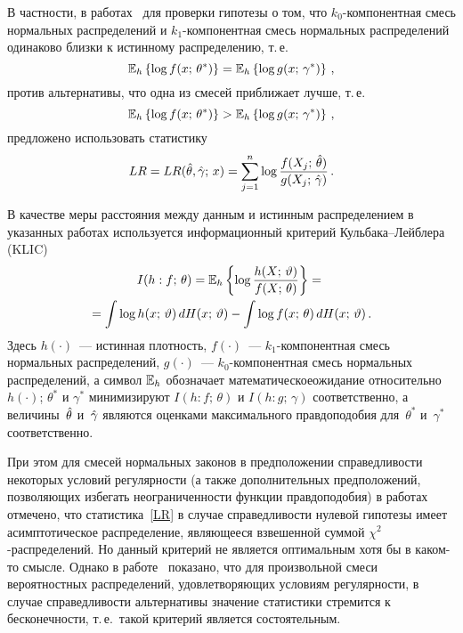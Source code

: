\begin{multicols}{2}
В частности, в работах~\cite{Lo2001, Lo2005} для проверки гипотезы о
том, что $k_0$-ком\-по\-нент\-ная смесь нормальных распределений и
$k_1$-ком\-по\-нент\-ная смесь нормальных распределений одинаково близки к
истинному распределению, т.\,е.
$$
\mathbb E_h\left\{\log f(x;\,\theta^*)\right\}=\mathbb E_h\left\{\log g(x;\,\gamma^*)\right\}\,,
$$
против альтернативы, что одна из смесей приближает лучше, т.\,е.
$$
\mathbb E_h\left\{\log f(x;\,\theta^*)\right\}>\mathbb E_h\left\{\log g(x;\,\gamma^*)\right\}\,,
$$
предложено использовать статистику
\begin{equation}
\label{LR}
LR=LR(\Hat\theta,\Hat\gamma;\,x)=\sum\limits_{j=1}^n\log\displaystyle\frac{\displaystyle f(X_j;\,\Hat\theta)\mathstrut}{\displaystyle g(X_j;\,\Hat\gamma)\mathstrut}\,.
\end{equation}

В качестве меры расстояния между данным и истинным распределением в
указанных работах используется информационный критерий
Куль\-ба\-ка--Лейб\-ле\-ра (KLIC)
\begin{multline*}
I(h:f;\,\theta)=\mathbb E_h\left\{\log\displaystyle\frac{\displaystyle h(X;\,\vartheta)\mathstrut}{\displaystyle f(X;\,\theta)\mathstrut}\right\}={}\\
\!{}=\int\log h(x;\,\vartheta)\,dH(x;\,\vartheta)-\int\log f(x;\,\theta)\,dH(x;\,\vartheta)\,.
\end{multline*}
Здесь $h(\cdot)$~--- истинная плотность, $f(\cdot)$~---
$k_1$-ком\-по\-нент\-ная смесь нормальных распределений, $g(\cdot)$~---
$k_0$-ком\-по\-нент\-ная смесь нормальных распределений, а символ $\mathbb E_h$
обозначает математическое\linebreak ожидание относительно~$h(\cdot)$;
$\theta^*$ и $\gamma^*$ минимизируют $I(h:f;\,\theta)$ и
$I(h:g;\,\gamma)$ соответственно, а величины~$\Hat\theta$ 
и~$\Hat\gamma$ являются оценками максимального правдоподобия для~$\theta^*$ 
и~$\gamma^*$ соответственно.

При этом для смесей нормальных законов в предположении
справедливости некоторых условий регулярности (а также
дополнительных предположений, позволяющих избегать неограниченности
функции правдоподобия) в работах~\cite{Lo2001, Lo2005} отмечено, что
статистика~\eqref{LR} в случае спра\-вед\-ли\-вости нулевой гипотезы имеет
асимптотическое распределение, являющееся взвешенной суммой
$\chi^2$-рас\-пре\-де\-ле\-ний. Но данный критерий не является оптимальным
хотя бы в каком-то смысле. Однако в работе~\cite{Vuong1989}
показано, что для произвольной смеси вероятностных распределений,
удовлетворяющих условиям регулярности, в случае справедливости
альтернативы значение статистики стремится к бесконечности, т.\,е.\
такой критерий является состоятельным.


\end{multicols}
